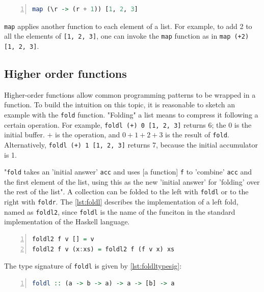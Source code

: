 \begin{lstlisting}[language=Haskell, numbers=left, caption={Lambda functions}, captionpos=b, label={lst:lambdafunction}]
map (\r -> (r + 1)) [1, 2, 3]
\end{lstlisting}

\lstinline!map! applies another function to each element of a list. For example, to add 2 to all the elements of \lstinline![1, 2, 3]!, one can invoke the \lstinline!map! function as in \lstinline!map (+2) [1, 2, 3]!. 

\subsection{Higher order functions}

Higher-order functions allow common programming patterns to be wrapped in a function. To build the intuition on this topic, it is reasonable to sketch an example with the \lstinline!fold! function. "Folding" a list means to compress it following a certain operation. For example, \lstinline!foldl (+) 0 [1, 2, 3]! returns 6; the 0 is the initial buffer. $+$ is the operation, and $0 + 1 + 2 +3$ is the result of \lstinline!fold!. Alternatively, \lstinline!foldl (+) 1 [1, 2, 3]! returns 7, because the initial accumulator is 1.

"\lstinline!fold! takes an 'initial answer' \lstinline!acc! and uses [a function] \lstinline!f! to 'combine' \lstinline!acc! and the first element of the list, using this as the new 'initial answer' for 'folding' over the rest of the list"\cite{plcoursera}. A collection can be folded to the left with \lstinline!foldl! or to the right with \lstinline!foldr!. The \cref{lst:foldl} describes the implementation of a left fold, named as \lstinline!foldl2!, since \lstinline!foldl! is the name of the funciton in the standard implementation of the Haskell language.

\begin{lstlisting}[language=Haskell, numbers=left, caption={fold left}, captionpos=b, label={lst:foldl}]
foldl2 f v [] = v
foldl2 f v (x:xs) = foldl2 f (f v x) xs
\end{lstlisting}

The type signature of \lstinline!foldl! is given by \cref{lst:foldltypesig}:

\begin{lstlisting}[language=Haskell, numbers=left, caption={fold left type signature}, captionpos=b, label={lst:foldltypesig}]
foldl :: (a -> b -> a) -> a -> [b] -> a
\end{lstlisting}

